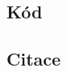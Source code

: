 \documentclass{cygclanek}
\begin{document}
% 
% 
% 


\subsection{Kód}

\subsection{Citace}
\end{document}
